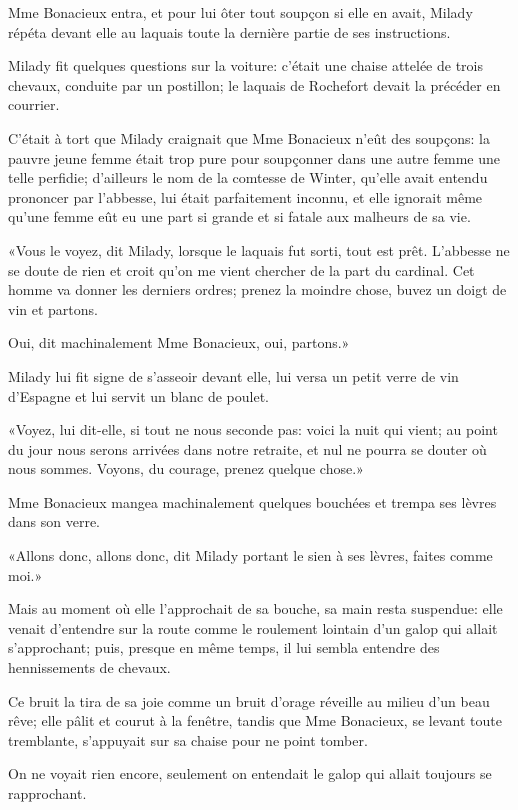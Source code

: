 Mme Bonacieux entra, et pour lui ôter tout soupçon si elle en avait, Milady répéta devant elle au laquais toute la dernière partie de ses instructions. 

Milady fit quelques questions sur la voiture: c'était une chaise attelée de trois chevaux, conduite par un postillon; le laquais de Rochefort devait la précéder en courrier. 

C'était à tort que Milady craignait que Mme Bonacieux n'eût des soupçons: la pauvre jeune femme était trop pure pour soupçonner dans une autre femme une telle perfidie; d'ailleurs le nom de la comtesse de Winter, qu'elle avait entendu prononcer par l'abbesse, lui était parfaitement inconnu, et elle ignorait même qu'une femme eût eu une part si grande et si fatale aux malheurs de sa vie. 

«Vous le voyez, dit Milady, lorsque le laquais fut sorti, tout est prêt. L'abbesse ne se doute de rien et croit qu'on me vient chercher de la part du cardinal. Cet homme va donner les derniers ordres; prenez la moindre chose, buvez un doigt de vin et partons. 

\speak  Oui, dit machinalement Mme Bonacieux, oui, partons.» 

Milady lui fit signe de s'asseoir devant elle, lui versa un petit verre de vin d'Espagne et lui servit un blanc de poulet. 

«Voyez, lui dit-elle, si tout ne nous seconde pas: voici la nuit qui vient; au point du jour nous serons arrivées dans notre retraite, et nul ne pourra se douter où nous sommes. Voyons, du courage, prenez quelque chose.» 

Mme Bonacieux mangea machinalement quelques bouchées et trempa ses lèvres dans son verre. 

«Allons donc, allons donc, dit Milady portant le sien à ses lèvres, faites comme moi.» 

Mais au moment où elle l'approchait de sa bouche, sa main resta suspendue: elle venait d'entendre sur la route comme le roulement lointain d'un galop qui allait s'approchant; puis, presque en même temps, il lui sembla entendre des hennissements de chevaux. 

Ce bruit la tira de sa joie comme un bruit d'orage réveille au milieu d'un beau rêve; elle pâlit et courut à la fenêtre, tandis que Mme Bonacieux, se levant toute tremblante, s'appuyait sur sa chaise pour ne point tomber. 

On ne voyait rien encore, seulement on entendait le galop qui allait toujours se rapprochant. 

